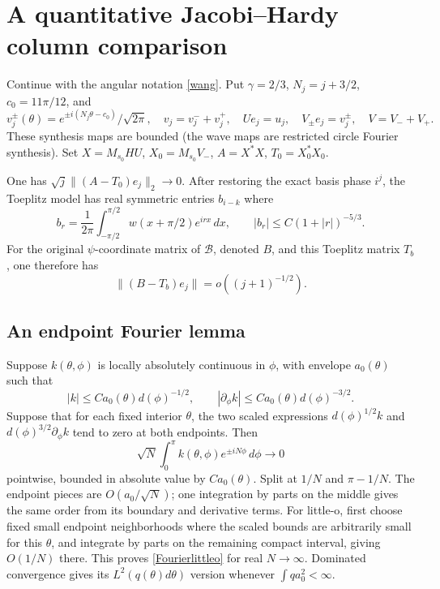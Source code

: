 \section{A quantitative Jacobi--Hardy column comparison}\label{sec:columns}
Continue with the angular notation \eqref{wang}. Put $\gamma=2/3$,
$N_j=j+3/2$, $c_0=11\pi/12$, and
\[
 v_j^\pm(\theta)=e^{\pm i(N_j\theta-c_0)}/\sqrt{2\pi},\quad
 v_j=v_j^-+v_j^+,\quad Ue_j=u_j,\quad V_\pm e_j=v_j^\pm,\quad V=V_-+V_+.
\]
These synthesis maps are bounded (the wave maps are restricted circle
Fourier synthesis). Set $X=M_{s_0}HU$, $X_0=M_{s_0}V_-$,
$A=X^*X$, $T_0=X_0^*X_0$.

\begin{theorem}\label{thm:columns}
One has $\sqrt j\|(A-T_0)e_j\|_2\to0$.
After restoring the exact basis phase $i^j$, the Toeplitz model has
real symmetric entries $b_{i-k}$ where
\begin{equation}\label{Toeplitzsymbol}
 b_r=\frac1{2\pi}\int_{-\pi/2}^{\pi/2}w(x+\pi/2)e^{irx}\,dx,
 \qquad |b_r|\le C(1+|r|)^{-5/3}.
\end{equation}
For the original $\psi$-coordinate matrix of $\mathcal B$, denoted
$B$, and this Toeplitz matrix $T_b$, one therefore has
\begin{equation}\label{originalcolumns}
 \|(B-T_b)e_j\|=o((j+1)^{-1/2}).
\end{equation}
\end{theorem}

\subsection{An endpoint Fourier lemma}
Suppose $k(\theta,\phi)$ is locally absolutely continuous in $\phi$,
with envelope $a_0(\theta)$ such that
\[
 |k|\le Ca_0(\theta)d(\phi)^{-1/2},\qquad
 |\partial_\phi k|\le Ca_0(\theta)d(\phi)^{-3/2}.
\]
Suppose that for each fixed interior $\theta$, the two scaled
expressions $d(\phi)^{1/2}k$ and $d(\phi)^{3/2}\partial_\phi k$
tend to zero at both endpoints. Then
\begin{equation}\label{Fourierlittleo}
 \sqrt N\int_0^\pi k(\theta,\phi)e^{\pm iN\phi}\,d\phi\longrightarrow0
\end{equation}
pointwise, bounded in absolute value by $Ca_0(\theta)$.
Split at $1/N$ and $\pi-1/N$. The endpoint pieces are
$O(a_0/\sqrt N)$; one integration by parts on the middle gives
the same order from its boundary and derivative terms. For little-o,
first choose fixed small endpoint neighborhoods where the scaled
bounds are arbitrarily small for this $\theta$, and integrate by
parts on the remaining compact interval, giving $O(1/N)$ there.
This proves \eqref{Fourierlittleo} for real $N\to\infty$.
Dominated convergence gives its $L^2(q(\theta)d\theta)$ version
whenever $\int q a_0^2<\infty$.

